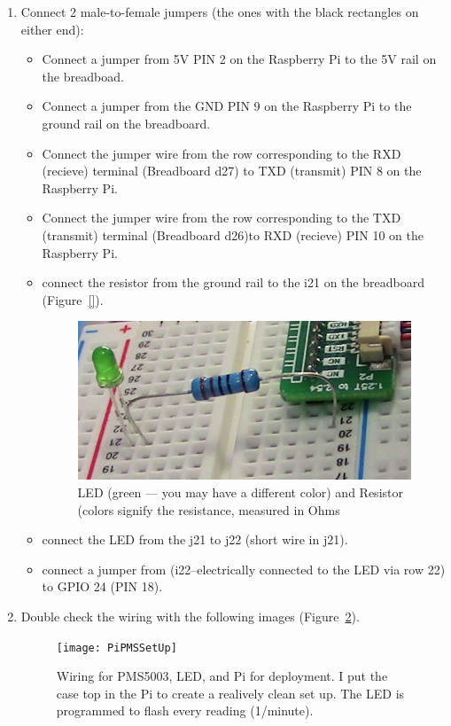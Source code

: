 \documentclass{article}
\begin{document}
\begin{enumerate}
  \item Connect 2 male-to-female jumpers (the ones with the black rectangles on either end):
 
\begin{itemize}
  \item Connect a jumper from 5V PIN 2 on the Raspberry Pi to the 5V rail on the breadboad.

  \item Connect a jumper from the GND PIN 9 on the Raspberry Pi to the ground rail on the breadboard. 

  \item Connect the jumper wire from the row corresponding to the RXD (recieve) terminal (Breadboard d27) to TXD (transmit) PIN 8 on the Raspberry Pi. 
  \item Connect the jumper wire from the row corresponding to the TXD (transmit) terminal (Breadboard d26)to RXD (recieve) PIN 10 on the Raspberry Pi.
  \item connect the resistor from the ground rail to the i21 on the breadboard (Figure~\ref{}).
  
\begin{figure}
\includegraphics[width=1.00\textwidth]{images/2_Resistor_LED_Breadboard.JPG}
\caption{LED (green --- you may have a different color) and Resistor (colors signify the resistance, measured in Ohms}
\label{fig:Breadborad-VCC-GND}
\end{figure}


  \item connect the LED from the j21 to j22 (short wire in j21).
  \item connect a jumper from (i22--electrically connected to the LED via row 22) to GPIO 24 (PIN 18).
\end{itemize}

\item Double check the wiring with the following images (Figure~\ref{fig:wiring}).

\begin{figure}
\texttt{[image: PiPMSSetUp]}
\caption{Wiring for PMS5003, LED, and Pi for deployment. I put the case top in the Pi to create a realively clean set up. The LED is programmed to flash every reading (1/minute).}
\label{fig:wiring}
\end{figure}

\end{enumerate}
\end{document}
